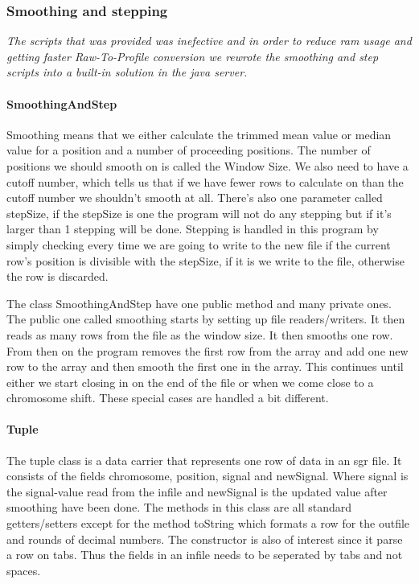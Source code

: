 \subsubsection{Smoothing and stepping}
\emph{The scripts that was provided was inefective and in order to reduce ram usage and getting faster Raw-To-Profile conversion we rewrote the smoothing and step scripts into a built-in solution in the java server.}

\paragraph{SmoothingAndStep}
Smoothing means that we either calculate the trimmed mean value or median value for a position and a number of proceeding positions. The number of positions we should smooth on is called the Window Size. We also need to have a cutoff number, which tells us that if we have fewer rows to calculate on than the cutoff number we shouldn't smooth at all. There's also one parameter called stepSize, if the stepSize is one the program will not do any stepping but if it's larger than 1 stepping will be done. Stepping is handled in this program by simply checking every time we are going to write to the new file if the current row's position is divisible with the stepSize, if it is we write to the file, otherwise the row is discarded.

The class SmoothingAndStep have one public method and many private ones. The public one called smoothing starts by setting up file readers/writers. It then reads as many rows from the file as the window size. It then smooths one row. From then on the program removes the first row from the array and add one new row to the array and then smooth the first one in the array. This continues until either we start closing in on the end of the file or when we come close to a chromosome shift. These special cases are handled a bit different.




\paragraph{Tuple}
The tuple class is a data carrier that represents one row of data in an sgr file. It consists of the fields chromosome, position, signal and newSignal. Where signal is the signal-value read from the infile and newSignal is the updated value after smoothing have been done.
The methods in this class are all standard getters/setters except for the method toString which formats a row for the outfile and rounds of decimal numbers. The constructor is also of interest since it parse a row on tabs. Thus the fields in an infile needs to be seperated by tabs and not spaces.


